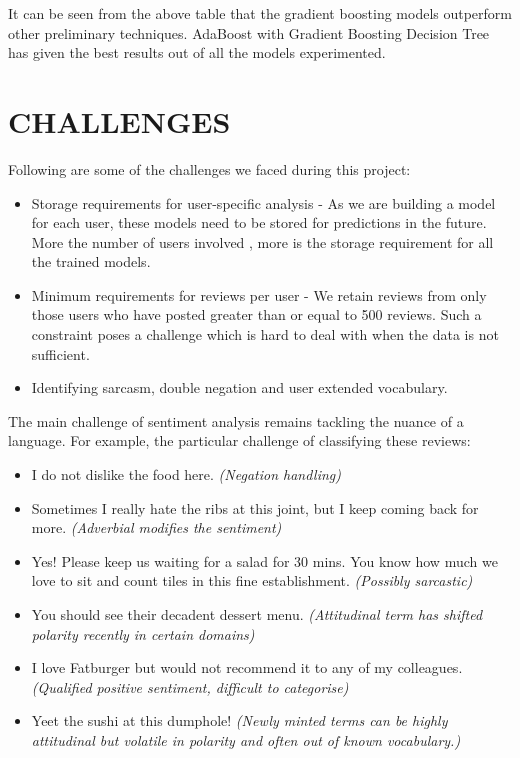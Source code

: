 \documentclass[letterpaper, 10 pt, conference]{ieeeconf}  %
\begin{document}
It can be seen from the above table that the gradient boosting models outperform other preliminary techniques. AdaBoost with Gradient Boosting Decision Tree has given the best results out of all the models experimented.

\section{CHALLENGES}
Following are some of the challenges we faced during this project:
\begin{itemize}
\item Storage requirements for user-specific analysis - As we are building a model for each user, these models need to be stored for predictions in the future. More the number of users involved , more is the storage requirement for all the trained models. 
\item Minimum requirements for reviews per user - We retain reviews from only those users who have posted greater than or equal to 500 reviews. Such a constraint poses a challenge which is hard to deal with when the data is not sufficient.
\item Identifying sarcasm, double negation and user extended vocabulary.\\
\end{itemize}
The main challenge of sentiment analysis remains tackling the nuance of a language. For example, the particular challenge of classifying these reviews:
\begin{itemize}
\item  I do not dislike the food here. \textit{(Negation handling)}
\item  Sometimes I really hate the ribs at this joint, but I keep coming back for more. \textit{(Adverbial modifies the sentiment)}
\item  Yes! Please keep us waiting for a salad for 30 mins. You know how much we love to sit and count tiles in this fine establishment. \textit{(Possibly sarcastic)}
\item  You should see their decadent dessert menu.\textit{ (Attitudinal term has shifted polarity recently in certain domains)}
\item  I love Fatburger but would not recommend it to any of my colleagues. \textit{(Qualified positive sentiment, difficult to categorise)}
\item  Yeet the sushi at this dumphole! \textit{(Newly minted terms can be highly attitudinal but volatile in polarity and often out of known vocabulary.)}
\end{itemize}
\end{document}
